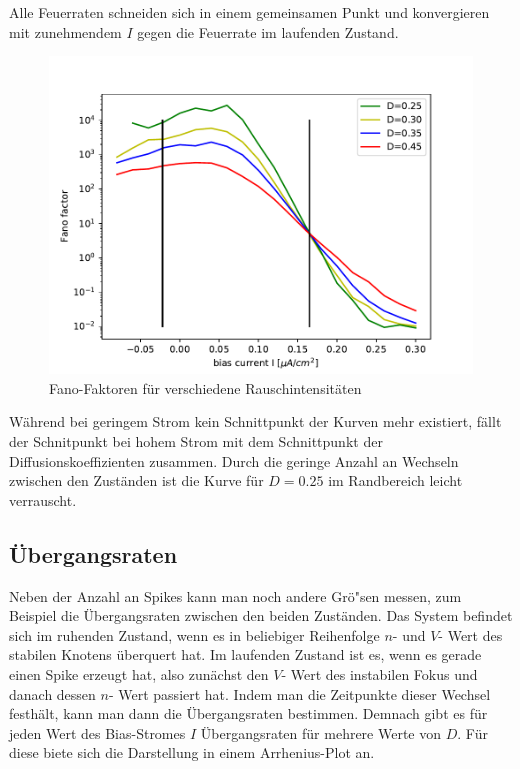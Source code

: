 \documentclass[12pt,a4paper]{article}
\begin{document}
Alle Feuerraten schneiden sich in einem gemeinsamen Punkt und konvergieren mit zunehmendem $I$ gegen die Feuerrate im laufenden Zustand.
\begin{figure}[H]
	\centering
	\includegraphics[scale=0.5]{fano.pdf}\caption{Fano-Faktoren für verschiedene Rauschintensitäten}
	\label{fano}
\end{figure}
Während bei geringem Strom kein Schnittpunkt der Kurven mehr existiert, fällt der Schnitpunkt bei hohem Strom mit dem Schnittpunkt der Diffusionskoeffizienten zusammen.
Durch die geringe Anzahl an Wechseln zwischen den Zuständen ist die Kurve für $D=0.25$ im Randbereich leicht verrauscht.
\\
\subsection{Übergangsraten}
Neben der Anzahl an Spikes kann man noch andere Grö"sen messen, zum Beispiel die Übergangsraten zwischen den beiden Zuständen. Das System befindet sich im ruhenden Zustand, wenn es in beliebiger Reihenfolge $n$- und $V$- Wert des stabilen Knotens überquert hat. Im laufenden Zustand ist es, wenn es gerade einen Spike erzeugt hat, also zunächst den $V$- Wert des instabilen Fokus und danach dessen $n$- Wert passiert hat. Indem man die Zeitpunkte dieser Wechsel festhält, kann man dann die Übergangsraten bestimmen. Demnach gibt es für jeden Wert des Bias-Stromes $I$ Übergangsraten für mehrere Werte von $D$. Für diese biete sich die Darstellung in einem Arrhenius-Plot an.
\end{document}
